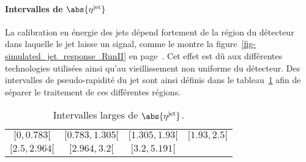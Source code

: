 \paragraph{Intervalles de $\abs{\eta^\text{jet}}$}
La calibration en énergie des jets dépend fortement de la région du détecteur dans laquelle le jet laisse un signal, comme le montre la figure~\ref{fig-simulated_jet_response_RunII} en page~\pageref{fig-simulated_jet_response_RunII}.
Cet effet est dû aux différentes technologies utilisées ainsi qu'au vieillissement non uniforme du détecteur.
Des intervalles de pseudo-rapidité du jet sont ainsi définis dans le tableau~\ref{tab-eta_jet_intervalles_large} afin de séparer le traitement de ces différentes régions.
\begin{table}[h]
\centering
\begin{tabular}{cccc}
\toprule
$[\num{0}, \num{0.783}[$ & $[\num{0.783}, \num{1.305}[$ & $[\num{1.305}, \num{1.93}[$ & $[\num{1.93}, \num{2.5}[$ \\
$[\num{2.5}, \num{2.964}[$ & $[\num{2.964}, \num{3.2}[$ & $[\num{3.2}, \num{5.191}[$ &  \\
\bottomrule
\end{tabular}
\caption{Intervalles larges de $\abs{\eta^\text{jet}}$.}
\label{tab-eta_jet_intervalles_large}
\end{table}
